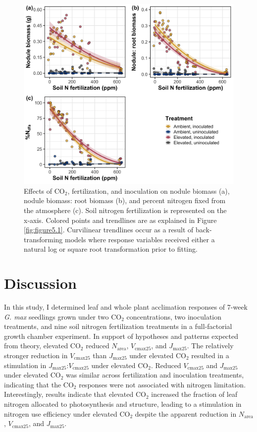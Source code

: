 \newpage
\begin{figure}
    \centering
    \includegraphics[width=\linewidth]{ch5_NxCO2xI/figs/NxCO2xI_fig5_nFix.png}
    \caption[Effects of CO$_2$, fertilization, and inoculation on nodule biomass, nodule biomass: root biomass, and percent nitrogen fixed from the atmosphere]{Effects of CO$_2$, fertilization, and inoculation on nodule biomass (a), nodule biomass: root biomass (b), and percent nitrogen fixed from the atmosphere (c). Soil nitrogen fertilization is represented on the x-axis. Colored points and trendlines are as explained in Figure \ref{fig:figure5.1}. Curvilinear trendlines occur as a result of back-transforming models where response variables received either a natural log or square root transformation prior to fitting.}
    \label{fig:figure5.5}
\end{figure}
\clearpage

\section{Discussion}
\noindent In this study, I determined leaf and whole plant acclimation responses of 7-week \textit{G. max} seedlings grown under two CO$_2$ concentrations, two inoculation treatments, and nine soil nitrogen fertilization treatments in a full-factorial growth chamber experiment. In support of hypotheses and patterns expected from theory, elevated CO$_2$ reduced $N_\mathrm{area}$, $V_\mathrm{cmax25}$, and $J_\mathrm{max25}$. The relatively stronger reduction in $V_\mathrm{cmax25}$ than $J_\mathrm{max25}$ under elevated CO$_2$ resulted in a stimulation in $J_\mathrm{max25}$:$V_\mathrm{cmax25}$ under elevated CO$_2$. Reduced $V_\mathrm{cmax25}$ and $J_\mathrm{max25}$ under elevated CO$_2$ was similar across fertilization and inoculation treatments, indicating that the CO$_2$ responses were not associated with nitrogen limitation. Interestingly, results indicate that elevated CO$_2$ increased the fraction of leaf nitrogen allocated to photosynthesis and structure, leading to a stimulation in nitrogen use efficiency under elevated CO$_2$ despite the apparent reduction in $N_\mathrm{area}$, $V_\mathrm{cmax25}$, and $J_\mathrm{max25}$.

